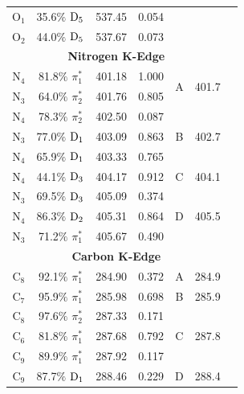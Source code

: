 \documentclass[12pt]{article}
\begin{document}
\begin{table}[!t]
\begin{tabular*}{8.5cm}{@{\extracolsep{\fill} }cccrccc}
    O$_1$
 &   35.6$\%$ $\rm D_5$  & 537.45 & 0.054 \\
    O$_2$
 &   44.0$\%$ $\rm D_5$  & 537.67 & 0.073 \vspace{0.05in}\\
  \multicolumn{6}{c}{\textbf{Nitrogen K-Edge}} \vspace{0.05in}\\
     N$_4$
 &   81.8$\%$ $\pi_1^*$  & 401.18 & 1.000 & \multirow{2}{*}{A} & \multirow{2}{*}{401.7} \\
    N$_3$
 &   64.0$\%$ $\pi_2^*$  & 401.76 & 0.805 
 \vspace{0.05in}\\
    N$_4$
 &   78.3$\%$ $\pi_2^*$  & 402.50 & 0.087 & \multirow{3}{*}{B} & \multirow{3}{*}{402.7}\\
    N$_3$
 &   77.0$\%$ $\rm D_1$  & 403.09 & 0.863 \\
    N$_4$
 &   65.9$\%$ $\rm D_1$  & 403.33 & 0.765 
 \vspace{0.05in}\\
    N$_4$
 &   44.1$\%$ $\rm D_3$  & 404.17 & 0.912 & C & 404.1 
 \vspace{0.05in}\\
    N$_3$
 &   69.5$\%$ $\rm D_3$  & 405.09 & 0.374  & \multirow{3}{*}{D} & \multirow{3}{*}{405.5} \\
    N$_4$
 &   86.3$\%$ $\rm D_2$  & 405.31 & 0.864 \\
    N$_3$
 &   71.2$\%$ $\pi_1^*$  & 405.67 & 0.490 \vspace{0.05in}\\
   \multicolumn{6}{c}{\textbf{Carbon K-Edge}} \vspace{0.05in}\\
       C$_8$
 &   92.1$\%$ $\pi_1^*$  & 284.90 & 0.372 & A & 284.9  
 \vspace{0.05in} \\
    C$_7$
 &   95.9$\%$ $\pi_1^*$  & 285.98 & 0.698 & B & 285.9
 \vspace{0.05in} \\
    C$_8$
 &   97.6$\%$ $\pi_2^*$  & 287.33 & 0.171   & \multirow{3}{*}{C} & \multirow{3}{*}{287.8}  \\
    C$_6$
 &   81.8$\%$ $\pi_1^*$  & 287.68 & 0.792 \\
    C$_9$
 &   89.9$\%$ $\pi_1^*$  & 287.92 & 0.117  
 \vspace{0.05in}  \\
     C$_9$
 &   87.7$\%$ $\rm D_1$  & 288.46 & 0.229 & D & 288.4
  \vspace{0.05in}  \\

\end{tabular*}
\end{table}
\end{document}
